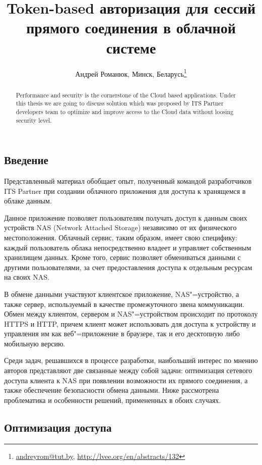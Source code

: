 \documentclass[10pt, a5paper]{article}
\begin{document}
\title{Token-based авторизация для сессий прямого соединения в облачной системе}
\author{Андрей Романюк, Минск, Беларусь\footnote{\url{andreyrom@tut.by}, \url{http://lvee.org/en/abstracts/132}}}
\maketitle
\begin{abstract}
Performance and security is the cornerstone of the Cloud based applications. Under this thesis we are going to discuss solution which was proposed by ITS Partner developers team to optimize and improve access to the Cloud data without loosing security level. 
\end{abstract}
\subsection*{Введение}

Представленный материал обобщает опыт, полученный командой разработчиков ITS Partner при создании облачного приложения для доступа к хранящемся в облаке данным.

Данное приложение позволяет пользователям получать доступ к данным своих устройств NAS (Network Attached Storage) независимо от их физического местоположения. Облачный сервис, таким образом, имеет свою специфику: каждый пользователь облака непосредственно владеет и управляет собственным хранилищем данных. Кроме того, сервис позволяет обмениваться данными с другими пользователями, за счет предоставления доступа к отдельным ресурсам на своих NAS.

В обмене данными участвуют клиентское приложение, NAS"=устройство, а также сервер, используемый в качестве промежуточного звена коммуникации. Обмен между клиентом, сервером и NAS"=устройством происходит по протоколу HTTPS и HTTP, причем клиент может использовать для доступа к устройству и управления им как веб"=приложение в браузере, так и его десктопную либо мобильную версию.

Среди задач, решавшихся в процессе разработки, наибольший интерес по мнению авторов представляют две связанные между собой задачи: оптимизация сетевого доступа клиента к NAS при появлении возможности их прямого соединения, а также обеспечение безопасности обмена данными. Ниже рассмотрена проблематика и особенности решений, примененных в обоих случаях.

\subsection*{Оптимизация доступа}
\end{document}
